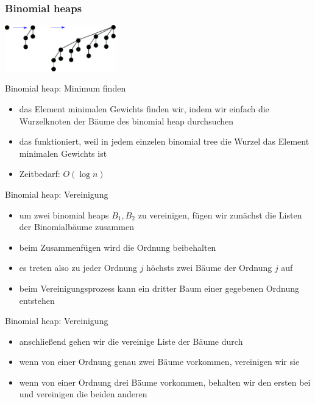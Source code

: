 \documentclass[aspectratio=1610, 11pt]{beamer}
\newcommand{\mytitle}{Binomial heaps}
\begin{document}
\begin{frame}\frametitle{\mytitle}
	\hfill\includegraphics[height=20mm]{images/binheap.pdf}
	\begin{overprint}
		\begin{exampleblock}{Binomial heap: Minimum finden}
			\begin{itemize}
				\item das Element minimalen Gewichts finden wir, indem wir einfach die Wurzelknoten der B\"aume des binomial heap durchsuchen
				\item das funktioniert, weil in jedem einzelen binomial tree die Wurzel das Element minimalen Gewichts ist
				\item Zeitbedarf: $O(\log n)$
			\end{itemize}
		\end{exampleblock}
		\begin{exampleblock}{Binomial heap: Vereinigung}
			\begin{itemize}
				\item um zwei binomial heaps $B_1,B_2$ zu vereinigen, f\"ugen wir zun\"achst die Listen der Binomialb\"aume zusammen
				\item beim Zusammenf\"ugen wird die Ordnung beibehalten
				\item es treten also zu jeder Ordnung $j$ h\"ochsts zwei B\"aume der Ordnung $j$ auf
				\item beim Vereinigungsprozess kann ein dritter Baum einer gegebenen Ordnung entstehen
			\end{itemize}
		\end{exampleblock}
		\begin{exampleblock}{Binomial heap: Vereinigung}
			\begin{itemize}
				\item anschlie\ss end gehen wir die vereinige Liste der B\"aume durch
				\item wenn von einer Ordnung genau zwei B\"aume vorkommen, vereinigen wir sie
				\item wenn von einer Ordnung drei B\"aume vorkommen, behalten wir den ersten bei und vereinigen die beiden anderen
			\end{itemize}
		\end{exampleblock}

\end{overprint}
\end{frame}
\end{document}
